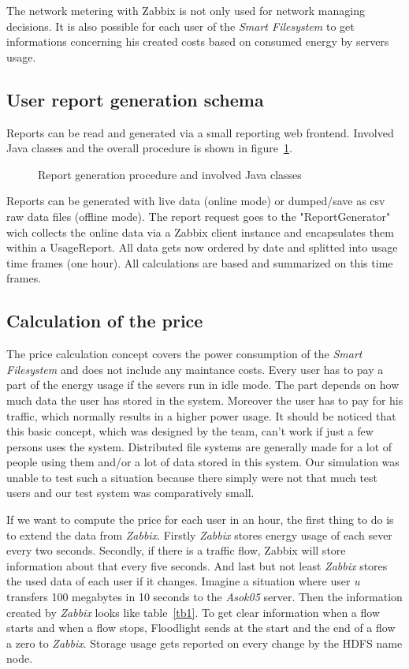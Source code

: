 The network metering with Zabbix is not only used for network managing decisions. It is also possible for each user of the \textit{Smart Filesystem} to get informations concerning his created costs based on consumed energy by servers usage.

\subsection{User report generation schema}
  Reports can be read and generated via a small reporting web frontend. Involved Java classes and the overall procedure is shown in figure~\ref{akt}.

 \begin{figure}
 \centering
 
 \caption{Report generation procedure and involved Java classes}
 \label{akt}
 \end{figure}

 Reports can be generated with live data (online mode) or dumped/save as csv raw data files (offline mode). The report request goes to the "ReportGenerator" wich collects the online data via a Zabbix client instance and encapsulates them within a UsageReport. All data gets now ordered by date and splitted into usage time frames (one hour). All calculations are based and summarized on this time frames.
 
 \subsection{Calculation of the price} 
 The price calculation concept covers the power consumption of the \textit{Smart Filesystem} and does not include any maintance costs.
 Every user has to pay a part of the energy usage if the severs run in idle mode. The part depends on how much data the user has stored in the system. Moreover the user has to pay for his traffic, which normally results in a higher power usage. It should be noticed that this basic concept, which was designed by the team, can't work if just a few persons uses the system. Distributed file systems are generally made for a lot of people using them and/or a lot of data stored in this system. Our simulation was unable to test such a situation because there simply were not that much test users and our test system was comparatively small. 
 
 If we want to compute the price for each user in an hour, the first thing to do is to extend the data from \textit{Zabbix}. Firstly \textit{Zabbix} stores energy usage of each sever every two seconds. Secondly, if there is a traffic flow, Zabbix will store information about that every five seconds. And last but not least \textit{Zabbix} stores the used data of each user if it changes. Imagine a situation where user \textit{u} transfers 100 megabytes in 10 seconds to the \textit{Asok05} server. Then the information created by \textit{Zabbix} looks like table~\ref{tb1}. 
 To get clear information when a flow starts and when a flow stops, Floodlight sends at the start and the end of a flow a zero to \textit{Zabbix}. Storage usage gets reported on every change by the HDFS name node.

